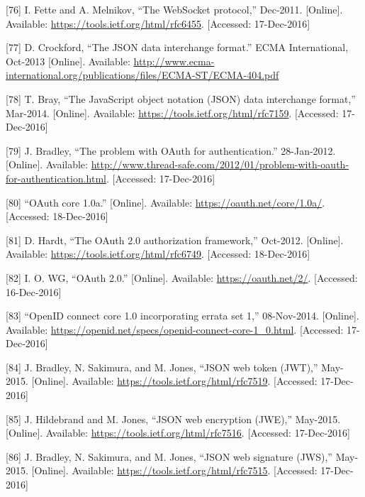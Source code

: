 \documentclass[12pt,english,a4paper,titlepage,cleardoublepage=empty,dottedtoc]{report}
\begin{document}
\hypertarget{ref-web_spec_websockets}{}
{[}76{]} I. Fette and A. Melnikov, ``The WebSocket protocol,'' Dec-2011.
{[}Online{]}. Available: \url{https://tools.ietf.org/html/rfc6455}.
{[}Accessed: 17-Dec-2016{]}

\hypertarget{ref-web_spec_json}{}
{[}77{]} D. Crockford, ``The JSON data interchange format.'' ECMA
International, Oct-2013 {[}Online{]}. Available:
\url{http://www.ecma-international.org/publications/files/ECMA-ST/ECMA-404.pdf}

\hypertarget{ref-web_rfc_json}{}
{[}78{]} T. Bray, ``The JavaScript object notation (JSON) data
interchange format,'' Mar-2014. {[}Online{]}. Available:
\url{https://tools.ietf.org/html/rfc7159}. {[}Accessed: 17-Dec-2016{]}

\hypertarget{ref-web_2012_problem-with-oauth-for-authentication}{}
{[}79{]} J. Bradley, ``The problem with OAuth for authentication.''
28-Jan-2012. {[}Online{]}. Available:
\url{http://www.thread-safe.com/2012/01/problem-with-oauth-for-authentication.html}.
{[}Accessed: 17-Dec-2016{]}

\hypertarget{ref-web_spec_oauth-1a}{}
{[}80{]} ``OAuth core 1.0a.'' {[}Online{]}. Available:
\url{https://oauth.net/core/1.0a/}. {[}Accessed: 18-Dec-2016{]}

\hypertarget{ref-web_spec_oauth-2}{}
{[}81{]} D. Hardt, ``The OAuth 2.0 authorization framework,'' Oct-2012.
{[}Online{]}. Available: \url{https://tools.ietf.org/html/rfc6749}.
{[}Accessed: 18-Dec-2016{]}

\hypertarget{ref-web_2016_oauth-2}{}
{[}82{]} I. O. WG, ``OAuth 2.0.'' {[}Online{]}. Available:
\url{https://oauth.net/2/}. {[}Accessed: 16-Dec-2016{]}

\hypertarget{ref-web_spec_openid-connect-1}{}
{[}83{]} ``OpenID connect core 1.0 incorporating errata set 1,''
08-Nov-2014. {[}Online{]}. Available:
\url{https://openid.net/specs/openid-connect-core-1_0.html}.
{[}Accessed: 17-Dec-2016{]}

\hypertarget{ref-web_spec_json-web-token}{}
{[}84{]} J. Bradley, N. Sakimura, and M. Jones, ``JSON web token
(JWT),'' May-2015. {[}Online{]}. Available:
\url{https://tools.ietf.org/html/rfc7519}. {[}Accessed: 17-Dec-2016{]}

\hypertarget{ref-web_spec_json-web-encryption}{}
{[}85{]} J. Hildebrand and M. Jones, ``JSON web encryption (JWE),''
May-2015. {[}Online{]}. Available:
\url{https://tools.ietf.org/html/rfc7516}. {[}Accessed: 17-Dec-2016{]}

\hypertarget{ref-web_spec_json-web-signature}{}
{[}86{]} J. Bradley, N. Sakimura, and M. Jones, ``JSON web signature
(JWS),'' May-2015. {[}Online{]}. Available:
\url{https://tools.ietf.org/html/rfc7515}. {[}Accessed: 17-Dec-2016{]}
\end{document}
